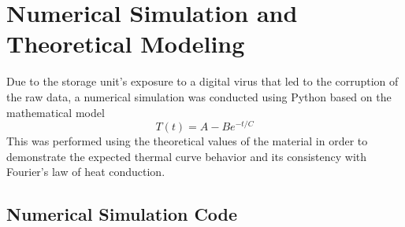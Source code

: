 \documentclass[12pt,a4paper,twoside]{article}
\begin{document}
\section{Numerical Simulation and Theoretical Modeling}

Due to the storage unit's exposure to a digital virus that led to the corruption of the raw data, a numerical simulation was conducted using Python based on the mathematical model
\[
T(t) = A - B e^{-t/C}
\]
This was performed using the theoretical values of the material in order to demonstrate the expected thermal curve behavior and its consistency with Fourier’s law of heat conduction.

\subsection{Numerical Simulation Code}
\end{document}
